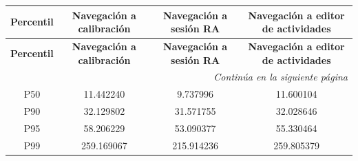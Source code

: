 \begin{longtable}{@{}cccc@{}}

\toprule
\textbf{Percentil} &
\textbf{Navegación a calibración} &
\textbf{Navegación a sesión RA} &
\textbf{Navegación a editor de actividades} \\
\toprule
\endfirsthead

\toprule
\textbf{Percentil} &
\textbf{Navegación a calibración} &
\textbf{Navegación a sesión RA} &
\textbf{Navegación a editor de actividades} \\
\toprule
\endhead

\midrule[\heavyrulewidth]
\multicolumn{4}{r}{\textit{Continúa en la siguiente página}}\\
\endfoot

\bottomrule
\endlastfoot

P50 & 11.442240 & 9.737996 & 11.600104 \\
P90 & 32.129802 & 31.571755 & 32.028646 \\
P95 & 58.206229 & 53.090377 & 55.330464 \\
P99 & 259.169067 & 215.914236 & 259.805379 \\

\end{longtable}